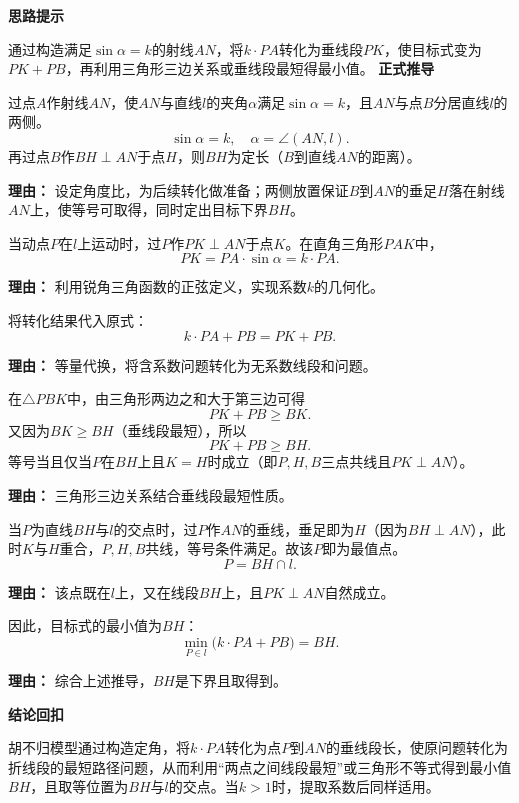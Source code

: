 \begin{proofbox}
	\textbf{\textcolor{CProof}{思路提示}}

	通过构造满足$\sin\alpha=k$的射线$AN$，将$k\cdot PA$转化为垂线段$PK$，使目标式变为$PK+PB$，再利用三角形三边关系或垂线段最短得最小值。
	\medskip
	\textbf{\textcolor{CProof}{正式推导}}
	\begin{description}[style=nextline, leftmargin=2.8em, labelsep=0.5em, itemsep=0.55em]
		\item[\textbf{步骤一（构造定角与固定垂足）：}]
			过点$A$作射线$AN$，使$AN$与直线$l$的夹角$\alpha$满足$\sin\alpha=k$，且$AN$与点$B$分居直线$l$的两侧。
			\[
				\sin\alpha = k,\quad \alpha = \angle(AN,l).
			\]
			再过点$B$作$BH\perp AN$于点$H$，则$BH$为定长（$B$到直线$AN$的距离）。
			\par\textbf{理由：} 设定角度比，为后续转化做准备；两侧放置保证$B$到$AN$的垂足$H$落在射线$AN$上，使等号可取得，同时定出目标下界$BH$。

		\item[\textbf{步骤二（转化系数）：}]
			当动点$P$在$l$上运动时，过$P$作$PK\perp AN$于点$K$。在直角三角形$PAK$中，
			\[
				PK = PA\cdot\sin\alpha = k\cdot PA.
			\]
			\par\textbf{理由：} 利用锐角三角函数的正弦定义，实现系数$k$的几何化。

		\item[\textbf{步骤三（合并目标）：}]
			将转化结果代入原式：
			\[
				k\cdot PA + PB = PK + PB.
			\]
			\par\textbf{理由：} 等量代换，将含系数问题转化为无系数线段和问题。

		\item[\textbf{步骤四（利用不等式）：}]
			在$\triangle PBK$中，由三角形两边之和大于第三边可得
			\[
				PK + PB \ge BK.
			\]
			又因为$BK \ge BH$（垂线段最短），所以
			\[
				PK + PB \ge BH.
			\]
			等号当且仅当$P$在$BH$上且$K=H$时成立（即$P,H,B$三点共线且$PK\perp AN$）。
			\par\textbf{理由：} 三角形三边关系结合垂线段最短性质。

		\item[\textbf{步骤五（验证取等）：}]
			当$P$为直线$BH$与$l$的交点时，过$P$作$AN$的垂线，垂足即为$H$（因为$BH\perp AN$），此时$K$与$H$重合，$P,H,B$共线，等号条件满足。故该$P$即为最值点。
			\[
				P = BH \cap l.
			\]
			\par\textbf{理由：} 该点既在$l$上，又在线段$BH$上，且$PK\perp AN$自然成立。

		\item[\textbf{步骤六（得出结论）：}]
			因此，目标式的最小值为$BH$：
			\[
				\min_{P\in l}\bigl(k\cdot PA+PB\bigr) = BH.
			\]
			\par\textbf{理由：} 综合上述推导，$BH$是下界且取得到。
	\end{description}
	\medskip
	\textbf{\textcolor{CProof}{结论回扣}}

	胡不归模型通过构造定角，将$k\cdot PA$转化为点$P$到$AN$的垂线段长，使原问题转化为折线段的最短路径问题，从而利用“两点之间线段最短”或三角形不等式得到最小值$BH$，且取等位置为$BH$与$l$的交点。当$k>1$时，提取系数后同样适用。
\end{proofbox}

